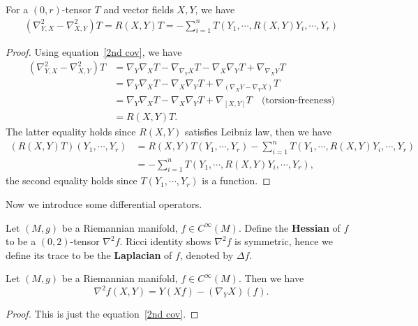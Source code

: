 \begin{prop}\label{Ricci identity}
    For a $(0,r)$-tensor $T$ and vector fields $X,Y$, we have
    \begin{align*}
        (\nabla^2_{Y,X}-\nabla^2_{X,Y})T=R(X,Y)T=-\sum_{i=1}^nT(Y_1,\cdots,R(X,Y)Y_i,\cdots,Y_r)
    \end{align*}
\end{prop}
\begin{proof}
    Using equation~\ref{2nd cov}, we have
    \begin{align*}
        (\nabla^2_{Y,X}-\nabla^2_{X,Y})T&=\nabla_Y\nabla_XT-\nabla_{\nabla_YX}T-\nabla_X\nabla_YT+\nabla_{\nabla_XY}T\\
        &=\nabla_Y\nabla_XT-\nabla_X\nabla_YT+\nabla_{(\nabla_XY-\nabla_YX)}T\\
        &=\nabla_Y\nabla_XT-\nabla_X\nabla_YT+\nabla_{[X,Y]}T\quad\text{(torsion-freeness)}\\
        &=R(X,Y)T.
    \end{align*}
    The latter equality holds since $R(X,Y)$ satisfies Leibniz law, then we have
    \begin{align*}
        (R(X,Y)T)(Y_1,\cdots,Y_r)&=R(X,Y)T(Y_1,\cdots,Y_r)-\sum_{i=1}^nT(Y_1,\cdots,R(X,Y)Y_i,\cdots,Y_r)\\
        &=-\sum_{i=1}^nT(Y_1,\cdots,R(X,Y)Y_i,\cdots,Y_r),
    \end{align*}
    the second equality holds since $T(Y_1,\cdots,Y_r)$ is a function.
\end{proof}

Now we introduce some differential operators.

\begin{defn}
    Let $(M,g)$ be a Riemannian manifold, $f\in C^\infty(M)$.
    Define the \textbf{Hessian} of $f$ to be a $(0,2)$-tensor $\nabla^2f$.
    Ricci identity shows $\nabla^2f$ is symmetric, hence we define its trace to be the \textbf{Laplacian} of $f$, denoted by $\Delta f$.
\end{defn}

\begin{prop}
    Let $(M,g)$ be a Riemannian manifold, $f\in C^\infty(M)$.
    Then we have
    \[\nabla^2f(X,Y)=Y(Xf)-(\nabla_YX)(f).\]
\end{prop}
\begin{proof}
    This is just the equation~\ref{2nd cov}.
\end{proof}